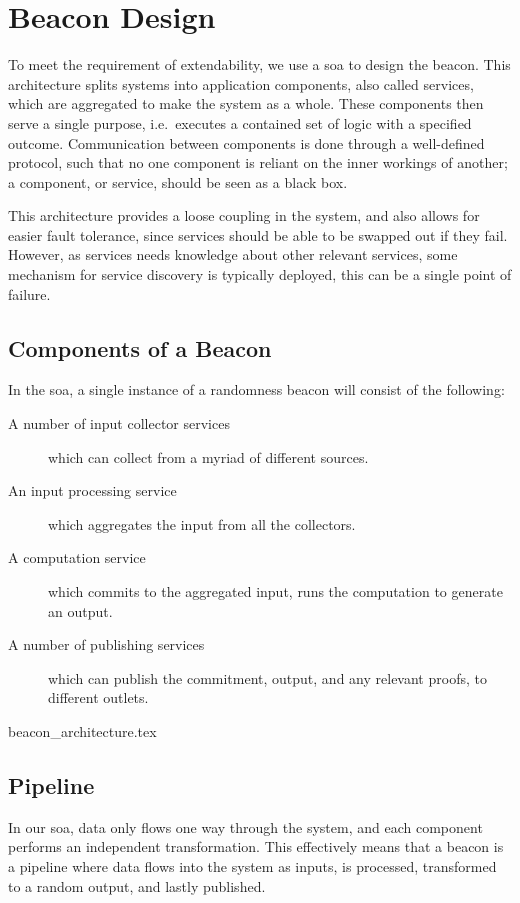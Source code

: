 \section{Beacon Design}

To meet the requirement of extendability, we use a \gls{soa} to design the beacon.
This architecture splits systems into application components, also called services, which are aggregated to make the system as a whole.
These components then serve a single purpose, i.e.\ executes a contained set of logic with a specified outcome.
Communication between components is done through a well-defined protocol, such that no one component is reliant on the inner workings of another;
a component, or service, should be seen as a black box.

This architecture provides a loose coupling in the system, and also allows for easier fault tolerance, since services should be able to be swapped out if they fail.
However, as services needs knowledge about other relevant services, some mechanism for service discovery is typically deployed, this can be a single point of failure.

\subsection{Components of a Beacon}
\label{sub:components_of_a_beacon}
In the \gls{soa}, a single instance of a randomness beacon will consist of the following:
\begin{description}
    \item[A number of input collector services] which can collect from a myriad of different sources.
    \item[An input processing service] which aggregates the input from all the collectors.
    \item[A computation service] which commits to the aggregated input, runs the computation to generate an output.
    \item[A number of publishing services] which can publish the commitment, output, and any relevant proofs, to different outlets.
\end{description}

{beacon_architecture.tex}

\subsection{Pipeline}%
\label{sub:pipeline}
In our \gls{soa}, %
data only flows one way through the system, and each component performs an independent transformation.
This effectively means that a beacon is a pipeline where data flows into the system as inputs, is processed, transformed to a random output, and lastly published.

